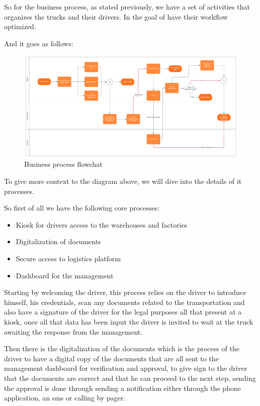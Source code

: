 So for the business process, as stated previously, we have a set of activities that organizes the trucks and their drivers.
In the goal of have their workflow optimized.

And it goes as follows:

\begin{figure}
    \centering
    \includegraphics[width=1\textwidth]{images/flowchart}
    \caption{\footnotesize{Business process flowchat}}
    \label{fig:flowchart}
\end{figure}

To give more context to the diagram above, we will dive into the details of it processes.

So first of all we have the following core processes:
\begin{itemize}
    \item Kiosk for drivers access to the warehouses and factories
    \item Digitalization of documents
    \item Secure access to logistics platform
    \item Dashboard for the management
\end{itemize}

Starting by welcoming the driver, this process relies on the driver to introduce himself, his credentials,
scan any documents related to the transportation and also have a signature of the driver for the legal purposes
all that present at a kiosk, once all that data has been input the driver is invited to wait at the truck awaiting
the response from the management.

Then there is the digitalization of the documents which is the process of the driver to have a digital copy
of the documents that are all sent to the management dashboard for verification and approval, to give sign
to the driver that the documents are correct and that he can proceed to the next step, sending the approval
is done through sending a notification either through the phone application, an sms or calling by pager.

